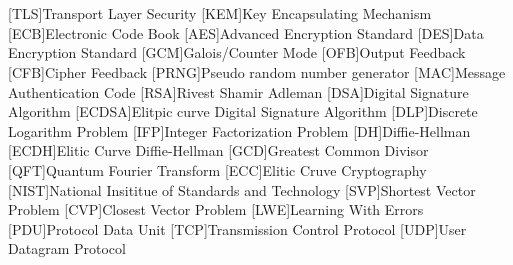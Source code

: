 \cleardoublepage
\chapter*{\listofabbrevname}
{}

\begin{acronym}[mmmmmmm]
	[TLS]{Transport Layer Security}
	[KEM]{Key Encapsulating Mechanism}
	[ECB]{Electronic Code Book}
	[AES]{Advanced Encryption Standard}
	[DES]{Data Encryption Standard}
	[GCM]{Galois/Counter Mode}
	[OFB]{Output Feedback}
	[CFB]{Cipher Feedback}
	[PRNG]{Pseudo random number generator}
	[MAC]{Message Authentication Code}
	[RSA]{Rivest Shamir Adleman}
	[DSA]{Digital Signature Algorithm}
	[ECDSA]{Elitpic curve Digital Signature Algorithm}
	[DLP]{Discrete Logarithm Problem}
	[IFP]{Integer Factorization Problem}
	[DH]{Diffie-Hellman}
	[ECDH]{Elitic Curve Diffie-Hellman}
	[GCD]{Greatest Common Divisor}
	[QFT]{Quantum Fourier Transform}
	[ECC]{Elitic Cruve Cryptography}
	[NIST]{National Insititue of Standards and Technology}
	[SVP]{Shortest Vector Problem}
	[CVP]{Closest Vector Problem}
	[LWE]{Learning With Errors}
  [PDU]{Protocol Data Unit}
  [TCP]{Transmission Control Protocol}
  [UDP]{User Datagram Protocol}
\end{acronym}
